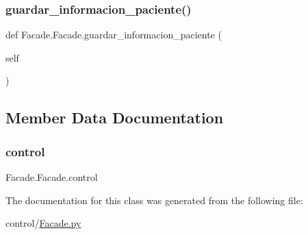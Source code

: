 \subsubsection{\texorpdfstring{guardar\+\_\+informacion\+\_\+paciente()}{guardar\_informacion\_paciente()}}
{\footnotesize\ttfamily def Facade.\+Facade.\+guardar\+\_\+informacion\+\_\+paciente (\begin{DoxyParamCaption}\item[{}]{self }\end{DoxyParamCaption})}



\subsection{Member Data Documentation}
\mbox{\label{class_facade_1_1_facade_a4ec08f6f7094ff267875a3abc6f0cb1b}} 
\subsubsection{\texorpdfstring{control}{control}}
{\footnotesize\ttfamily Facade.\+Facade.\+control}



The documentation for this class was generated from the following file\+:\begin{DoxyCompactItemize}
\item 
control/\mbox{\hyperlink{_facade_8py}{Facade.\+py}}\end{DoxyCompactItemize}
